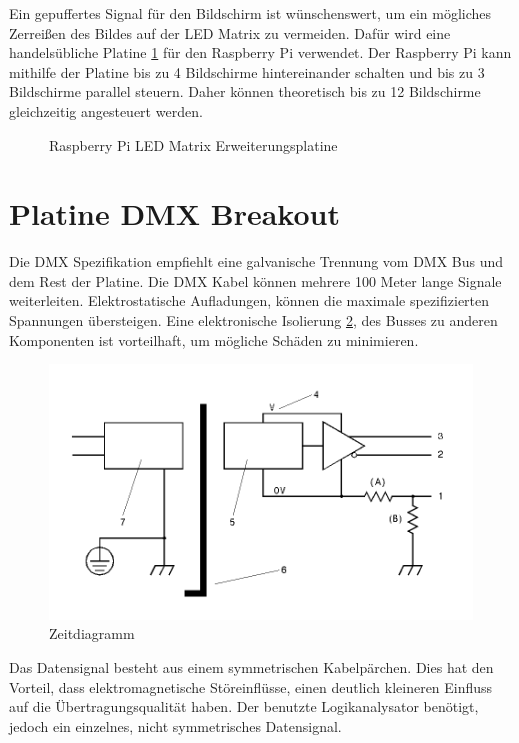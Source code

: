 Ein gepuffertes Signal für den Bildschirm ist wünschenswert, um ein mögliches Zerreißen des Bildes auf der LED Matrix zu vermeiden. Dafür wird eine handelsübliche Platine \ref{fig:led_matrix_steuer_platine} für den Raspberry Pi verwendet. Der Raspberry Pi kann mithilfe der Platine bis zu 4 Bildschirme hintereinander schalten und bis zu 3 Bildschirme parallel steuern. Daher können theoretisch bis zu 12 Bildschirme gleichzeitig angesteuert werden.

\begin{figure}[H]
	\centering
	\caption{Raspberry Pi LED Matrix Erweiterungsplatine}
	\cite[S.1]{JoyItLedMatrix}
	\label{fig:led_matrix_steuer_platine}
\end{figure}

\section{Platine DMX Breakout}

Die DMX Spezifikation empfiehlt eine galvanische Trennung vom DMX Bus und dem Rest der Platine\cite[S.22]{DMX512-Protocol-Standard}. Die DMX Kabel können mehrere 100 Meter lange Signale weiterleiten. Elektrostatische Aufladungen, können die maximale spezifizierten Spannungen übersteigen. Eine elektronische Isolierung \ref{fig:DmxIsolation}, des Busses zu anderen Komponenten ist vorteilhaft, um mögliche Schäden zu minimieren.

\begin{figure}[H]
	\centering
	\includegraphics[width=0.5\linewidth]{Pictures/DmxIsolation}
	\caption{Zeitdiagramm \cite[S.22]{DMX512-Protocol-Standard}}
	\label{fig:DmxIsolation}
\end{figure}

Das Datensignal  besteht aus einem symmetrischen Kabelpärchen. Dies hat den Vorteil, dass elektromagnetische Störeinflüsse, einen deutlich kleineren Einfluss auf die Übertragungsqualität haben. Der benutzte Logikanalysator benötigt, jedoch ein einzelnes, nicht symmetrisches Datensignal.

